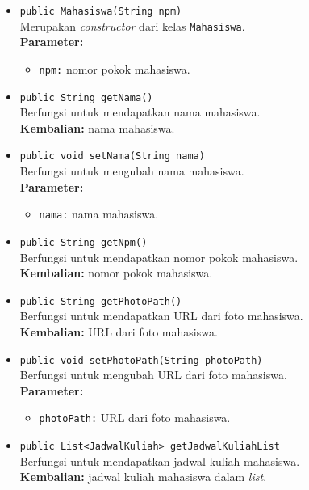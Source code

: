 \begin{itemize}
	\item \texttt{public Mahasiswa(String npm)}\\
	Merupakan \textit{constructor} dari kelas \texttt{Mahasiswa}.\\
	\textbf{Parameter:}
	\begin{itemize}
		\item \texttt{npm:} nomor pokok mahasiswa.
	\end{itemize}
	
	\item \texttt{public String getNama()}\\
		Berfungsi untuk mendapatkan nama mahasiswa.\\
		\textbf{Kembalian:} nama mahasiswa.

	\item \texttt{public void setNama(String nama)}\\
		Berfungsi untuk mengubah nama mahasiswa.\\
		\textbf{Parameter:}
		\begin{itemize}
			\item \texttt{nama:} nama mahasiswa.
		\end{itemize}

	\item \texttt{public String getNpm()}\\
		Berfungsi untuk mendapatkan nomor pokok mahasiswa.\\
		\textbf{Kembalian:} nomor pokok mahasiswa.
	
	\item \texttt{public String getPhotoPath()}\\
		Berfungsi untuk mendapatkan URL dari foto mahasiswa.\\
		\textbf{Kembalian:} URL dari foto mahasiswa.
	
	\item \texttt{public void setPhotoPath(String photoPath)}\\
		Berfungsi untuk mengubah URL dari foto mahasiswa.\\
        \textbf{Parameter:}
		\begin{itemize}
			\item \texttt{photoPath:} URL dari foto mahasiswa.
		\end{itemize}	
		
	\item \texttt{public List<JadwalKuliah> getJadwalKuliahList}\\
		Berfungsi untuk mendapatkan jadwal kuliah mahasiswa.\\
		\textbf{Kembalian:} jadwal kuliah mahasiswa dalam \textit{list}.
	

\end{itemize}
